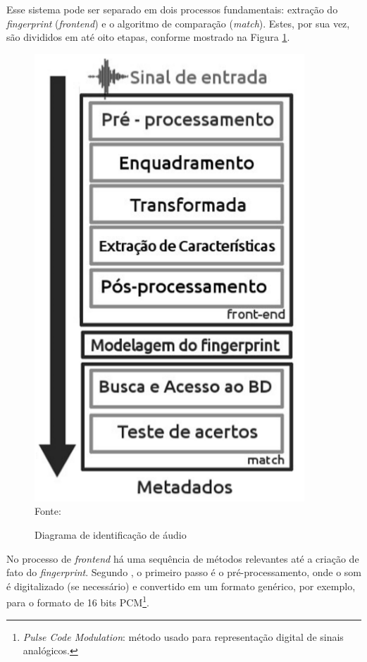 Esse sistema pode ser separado em dois processos fundamentais: extração do \textit{fingerprint} (\textit{frontend}) e o algoritmo de comparação (\textit{match}). Estes, por sua vez, são divididos em até oito etapas, conforme mostrado na Figura \ref{fig:etapasFinger}.

\begin{figure}[!htb]
   \centering
   \caption{Diagrama de identificação de áudio} \label{fig:etapasFinger} 
   \includegraphics[scale=0.47]{figuras/etapasFinger.png}
   \\Fonte: \cite{carreira2015}
\end{figure}

No processo de \textit{frontend} há uma sequência de métodos relevantes até a criação de fato do \textit{fingerprint}. Segundo , o primeiro passo é o pré-processamento, onde o som é digitalizado (se necessário) e convertido em um formato genérico, por exemplo, para o formato de 16 bits PCM\footnote{\textit{Pulse Code Modulation}: método usado para representação digital de sinais analógicos.}.


